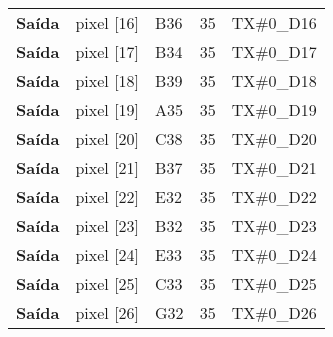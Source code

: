 \begin{longtable}{@{}rllll@{}}
			\multicolumn{1}{r|}{\textbf{Saída}} & pixel {[}16{]}                     & B36                                      & 35                                         & TX\#0\_D16                                      \\
			\multicolumn{1}{r|}{\textbf{Saída}} & pixel {[}17{]}                     & B34                                      & 35                                         & TX\#0\_D17                                      \\
			\multicolumn{1}{r|}{\textbf{Saída}} & pixel {[}18{]}                     & B39                                      & 35                                         & TX\#0\_D18                                      \\
			\multicolumn{1}{r|}{\textbf{Saída}} & pixel {[}19{]}                     & A35                                      & 35                                         & TX\#0\_D19                                      \\
			\multicolumn{1}{r|}{\textbf{Saída}} & pixel {[}20{]}                     & C38                                      & 35                                         & TX\#0\_D20                                      \\
			\multicolumn{1}{r|}{\textbf{Saída}} & pixel {[}21{]}                     & B37                                      & 35                                         & TX\#0\_D21                                      \\
			\multicolumn{1}{r|}{\textbf{Saída}} & pixel {[}22{]}                     & E32                                      & 35                                         & TX\#0\_D22                                      \\
			\multicolumn{1}{r|}{\textbf{Saída}} & pixel {[}23{]}                     & B32                                      & 35                                         & TX\#0\_D23                                      \\
			\multicolumn{1}{r|}{\textbf{Saída}} & pixel {[}24{]}                     & E33                                      & 35                                         & TX\#0\_D24                                      \\
			\multicolumn{1}{r|}{\textbf{Saída}} & pixel {[}25{]}                     & C33                                      & 35                                         & TX\#0\_D25                                      \\
			\multicolumn{1}{r|}{\textbf{Saída}} & pixel {[}26{]}                     & G32                                      & 35                                         & TX\#0\_D26                                      \\

\end{longtable}
